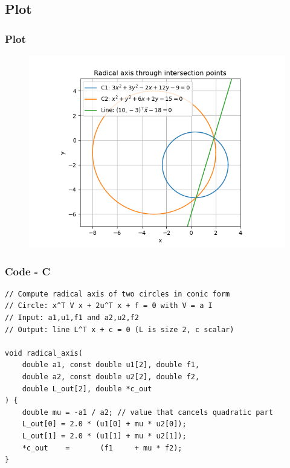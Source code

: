 \documentclass{beamer}
\theoremstyle{remark}
\numberwithin{equation}{section}
\begin{document}
\subsection{Plot}
\begin{frame}
    \frametitle{Plot}
\begin{figure}[H]
   \centering
   \includegraphics[width=0.8\columnwidth]{figs/radical.png}
   \caption{}
   \label{}
   \end{figure}
\end{frame}

\begin{frame}[fragile]
    \frametitle{Code - C}
    \begin{lstlisting}
// Compute radical axis of two circles in conic form
// Circle: x^T V x + 2u^T x + f = 0 with V = a I
// Input: a1,u1,f1 and a2,u2,f2
// Output: line L^T x + c = 0 (L is size 2, c scalar)

void radical_axis(
    double a1, const double u1[2], double f1,
    double a2, const double u2[2], double f2,
    double L_out[2], double *c_out
) {
    double mu = -a1 / a2; // value that cancels quadratic part
    L_out[0] = 2.0 * (u1[0] + mu * u2[0]);
    L_out[1] = 2.0 * (u1[1] + mu * u2[1]);
    *c_out    =       (f1     + mu * f2);
}


    \end{lstlisting}
    \end{frame}
\end{document}
